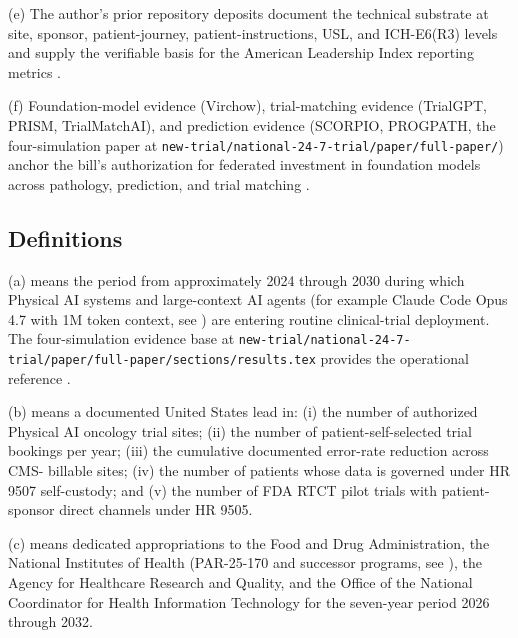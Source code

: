 (e) The author's prior repository deposits document the technical
substrate at site, sponsor, patient-journey, patient-instructions,
USL, and ICH-E6(R3) levels and supply the verifiable basis for the
American Leadership Index reporting metrics
\cite{kawchak_2026_19176370, kawchak_2026_19119939,
kawchak_2026_19396256, kawchak_2026_18810541,
kawchak_2026_18778219, kawchak_2026_18973368}.

(f) Foundation-model evidence (Virchow), trial-matching evidence
(TrialGPT, PRISM, TrialMatchAI), and prediction evidence (SCORPIO,
PROGPATH, the four-simulation paper at
\texttt{new-trial/national-24-7-trial/paper/full-paper/}) anchor the
bill's authorization for federated investment in foundation models
across pathology, prediction, and trial matching
\cite{vorontsov2024virchow, jin2024trialgpt, gupta2024prism,
abdallah2026trialmatchai, kawchak_2026_19994945}.

\subsection{Definitions}

(a)  means the period
from approximately 2024 through 2030 during which Physical AI
systems and large-context AI agents (for example Claude Code Opus
4.7 with 1M token context, see \cite{claude_opus_47}) are entering
routine clinical-trial deployment. The four-simulation evidence
base at
\texttt{new-trial/national-24-7-trial/paper/full-paper/sections/results.tex}
provides the operational reference \cite{kawchak_2026_19994945}.

(b)  means a documented United States
lead in:
(i) the number of authorized Physical AI oncology trial sites;
(ii) the number of patient-self-selected trial bookings per year;
(iii) the cumulative documented error-rate reduction across CMS-
billable sites;
(iv) the number of patients whose data is governed under HR 9507
self-custody; and
(v) the number of FDA RTCT pilot trials with patient-sponsor
direct channels under HR 9505.

(c)  means dedicated appropriations to
the Food and Drug Administration, the National Institutes of
Health (PAR-25-170 and successor programs, see
\cite{nih_par25_170_dht_endpoints}), the Agency for Healthcare
Research and Quality, and the Office of the National Coordinator
for Health Information Technology for the seven-year period 2026
through 2032.

